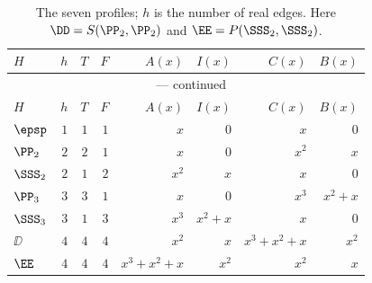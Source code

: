 \begingroup\renewcommand{\arraystretch}{1.25}
\begin{longtable}{lrrrrrrr}
\caption{The seven profiles; $h$ is the number of real edges. Here $\DD=S(\PP_2,\PP_2)$ and $\EE=P(\SSS_2,\SSS_2)$.}\label{tab:profiles}\\
\toprule
$H$ & $h$ & $T$ & $F$ & $A(x)$ & $I(x)$ & $C(x)$ & $B(x)$\\ \midrule
\endfirsthead
\multicolumn{8}{c}{\tablename~\thetable{} --- continued}\\[3pt]
\toprule
$H$ & $h$ & $T$ & $F$ & $A(x)$ & $I(x)$ & $C(x)$ & $B(x)$\\ \midrule
\endhead
$\epsp$ & $1$ & $1$ & $1$ & $x$ & $0$ & $x$ & $0$ \\
$\PP_2$ & $2$ & $2$ & $1$ & $x$ & $0$ & $x^{2}$ & $x$ \\
$\SSS_2$ & $2$ & $1$ & $2$ & $x^{2}$ & $x$ & $x$ & $0$ \\
$\PP_3$ & $3$ & $3$ & $1$ & $x$ & $0$ & $x^{3}$ & $x^{2}+x$ \\
$\SSS_3$ & $3$ & $1$ & $3$ & $x^{3}$ & $x^{2}+x$ & $x$ & $0$ \\
$\DD$ & $4$ & $4$ & $4$ & $x^{2}$ & $x$ & $x^{3}+x^{2}+x$ & $x^{2}$ \\
$\EE$ & $4$ & $4$ & $4$ & $x^{3}+x^{2}+x$ & $x^{2}$ & $x^{2}$ & $x$ \\
\bottomrule
\end{longtable}
\endgroup
